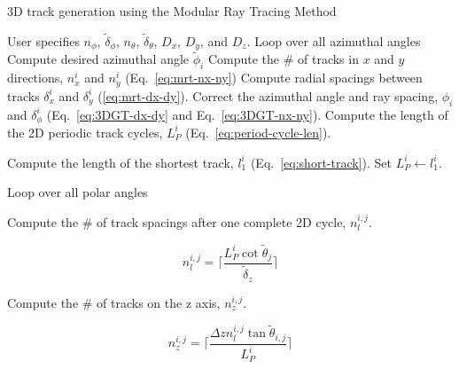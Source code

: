\begin{algorithm*}[!h]
	\caption{3D track generation using the Modular Ray Tracing Method}
	\label{alg:MRT}
	\begin{algorithmic}
		\State User specifies $n_{\phi}$, $\tilde{\delta}_{\phi}$, $n_{\theta}$, $\tilde{\delta}_{\theta}$, $D_x$, $D_y$, and $D_z$. \hspace{\fill}
		\vspace{0.1in}
		 \Comment Loop over all azimuthal angles
		\vspace{0.1in}
		\State Compute desired azimuthal angle $\tilde{\phi}_i$
		\State Compute the \# of tracks in $x$ and $y$ directions, $n_x^i$ and $n_y^i$ (Eq.~\ref{eq:mrt-nx-ny}) \hspace{\fill}
		\State Compute radial spacings between tracks $\delta_x^i$ and $\delta_y^i$ (\ref{eq:mrt-dx-dy}). \hspace{\fill}
		\State Correct the azimuthal angle and ray spacing, $\phi_i$ and $\delta_{\phi}^i$ (Eq.~\ref{eq:3DGT-dx-dy} and Eq.~\ref{eq:3DGT-nx-ny}).\hspace{\fill}
		\vspace{0.1in}
		\State Compute the length of the 2D periodic track cycles, $L_P^{i}$ (Eq.~\ref{eq:period-cycle-len}).
		
		\Else
		\State Compute the length of the shortest track, $l_1^i$ (Eq.~\ref{eq:short-track}). 
		\State Set $L_P^{i} \gets l_1^i$.
		
		\EndIf
		
		\vspace{0.1in}
		
		
		 \Comment Loop over all polar angles
		
		\vspace{0.2in}
		\State Compute the \# of track spacings after one complete 2D cycle, $n_l^{i,j}$.
		
		\begin{equation}
		n_l^{i,j} = \Bigg\lceil \frac{L_P^i \cot{\tilde{\theta}_{j}}}{\tilde{\delta}_z} \Bigg\rceil
		\nonumber
		\end{equation}
		
		\State Compute the \# of tracks on the z axis, $n_z^{i,j}$.
		
		\begin{equation}
		n_z^{i,j} = \Bigg\lceil\frac{\Delta z n_l^{i,j} \tan{\tilde{\theta}_{i,j}}}{L_P^i} \Bigg\rceil
		\nonumber
		\end{equation}
		

\end{algorithmic}
\end{algorithm*}
